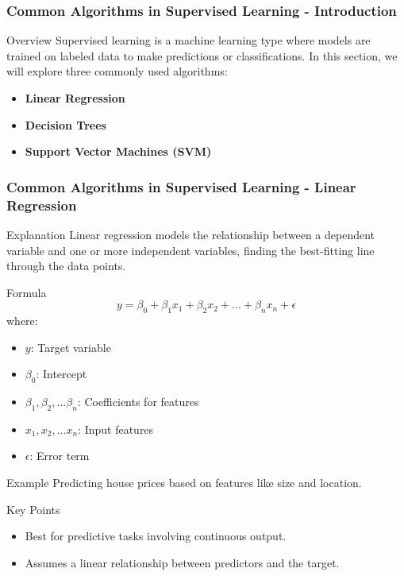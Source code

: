 \documentclass[aspectratio=169]{beamer}
\begin{document}
\begin{frame}[fragile]
    \frametitle{Common Algorithms in Supervised Learning - Introduction}
    \begin{block}{Overview}
        Supervised learning is a machine learning type where models are trained on labeled data to make predictions or classifications. 
        In this section, we will explore three commonly used algorithms:
        \begin{itemize}
            \item \textbf{Linear Regression}
            \item \textbf{Decision Trees}
            \item \textbf{Support Vector Machines (SVM)}
        \end{itemize}
    \end{block}
\end{frame}

\begin{frame}[fragile]
    \frametitle{Common Algorithms in Supervised Learning - Linear Regression}
    \begin{block}{Explanation}
        Linear regression models the relationship between a dependent variable and one or more independent variables, finding the best-fitting line through the data points.
    \end{block}
    
    \begin{block}{Formula}
        \[
        y = \beta_0 + \beta_1 x_1 + \beta_2 x_2 + ... + \beta_n x_n + \epsilon
        \]
        where:
        \begin{itemize}
            \item \(y\): Target variable
            \item \(\beta_0\): Intercept
            \item \(\beta_1, \beta_2, ... \beta_n\): Coefficients for features
            \item \(x_1, x_2, ... x_n\): Input features
            \item \(\epsilon\): Error term
        \end{itemize}
    \end{block}
    
    \begin{block}{Example}
        Predicting house prices based on features like size and location.
    \end{block}
    
    \begin{block}{Key Points}
        \begin{itemize}
            \item Best for predictive tasks involving continuous output.
            \item Assumes a linear relationship between predictors and the target.
        \end{itemize}
    \end{block}
\end{frame}
\end{document}
